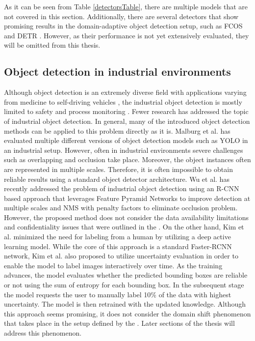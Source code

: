 As it can be seen from Table \ref{detectorsTable}, there are multiple models that are not covered in this section. Additionally, there are several detectors that show promising results in the domain-adaptive object detection setup, such as FCOS \cite{Tian2019} and DETR \cite{Zhang2021b}. However, as their performance is not yet extensively evaluated, they will be omitted from this thesis. 

\subsection{Object detection in industrial environments}
Although object detection is an extremely diverse field with applications varying from medicine \cite{9689485} to self-driving vehicles \cite{Janai2017, Shan2018}, the industrial object detection is mostly limited to safety and process monitoring \cite{Awalgaonkar2020, Banf2022}. Fewer research has addressed the topic of industrial object detection. In general, many of the introduced object detection methods can be applied to this problem directly as it is. Malburg et al. \cite{MALBURG2021581} has evaluated multiple different versions of object detection models such as YOLO \cite{Redmon2015a} in an industrial setup. However, often in industrial environments severe challenges such as overlapping and occlusion take place. Moreover, the object instances often are represented in multiple scales. Therefore, it is often impossible to obtain reliable results using a standard object detector architecture. Wu et al. \cite{Wu2022} has recently addressed the problem of industrial object detection using an R-CNN based approach that leverages Feature Pyramid Networks to improve detection at multiple scales and NMS with penalty factors to eliminate occlusion problem. However, the proposed method does not consider the data availability limitations and confidentiality issues that were outlined in the . On the other hand, Kim et al. \cite{Kim2020} minimized the need for labeling from a human by utilizing a deep active learning model. While the core of this approach is a standard Faster-RCNN \cite{ima} network, Kim et al. also proposed to utilize uncertainty evaluation in order to enable the model to label images interactively over time. As the training advances, the model evaluates whether the predicted bounding boxes are reliable or not using the sum of entropy for each bounding box. In the subsequent stage the model requests the user to manually label 10\% of the data with highest uncertainty. The model is then retrained with the updated knowledge. Although this approach seems promising, it  does not consider the domain shift phenomenon that takes place in the setup defined by the . Later sections of the thesis will address this phenomenon. 

